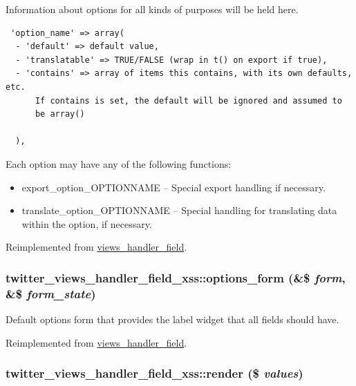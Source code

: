 Information about options for all kinds of purposes will be held here. 

\begin{Code}\begin{verbatim} 'option_name' => array(
  - 'default' => default value,
  - 'translatable' => TRUE/FALSE (wrap in t() on export if true),
  - 'contains' => array of items this contains, with its own defaults, etc.
      If contains is set, the default will be ignored and assumed to
      be array()

  ),
\end{verbatim}
\end{Code}

 Each option may have any of the following functions:\begin{itemize}
\item export\_\-option\_\-OPTIONNAME -- Special export handling if necessary.\item translate\_\-option\_\-OPTIONNAME -- Special handling for translating data within the option, if necessary. \end{itemize}


Reimplemented from \hyperlink{classviews__handler__field_64c69a8a3697603f8283405071c25b76}{views\_\-handler\_\-field}.\hypertarget{classtwitter__views__handler__field__xss_4896b110fa64c3beed9fb17b5f01b437}{
\subsubsection[{options\_\-form}]{\setlength{\rightskip}{0pt plus 5cm}twitter\_\-views\_\-handler\_\-field\_\-xss::options\_\-form (\&\$ {\em form}, \/  \&\$ {\em form\_\-state})}}
\label{classtwitter__views__handler__field__xss_4896b110fa64c3beed9fb17b5f01b437}


Default options form that provides the label widget that all fields should have. 

Reimplemented from \hyperlink{classviews__handler__field_0435d161922b7b4b84f02a2e79bb947a}{views\_\-handler\_\-field}.\hypertarget{classtwitter__views__handler__field__xss_bdab73a5e799f01200e58edcd603a32d}{
\subsubsection[{render}]{\setlength{\rightskip}{0pt plus 5cm}twitter\_\-views\_\-handler\_\-field\_\-xss::render (\$ {\em values})}}
\label{classtwitter__views__handler__field__xss_bdab73a5e799f01200e58edcd603a32d}


